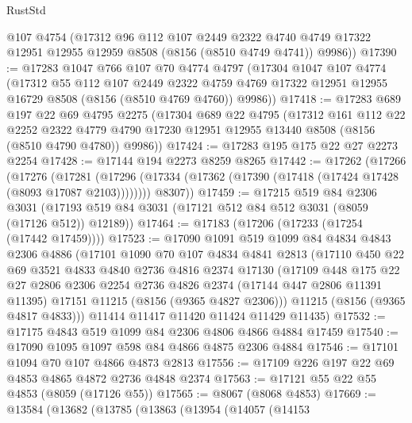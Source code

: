 \begin{lexlean}{RustStd}
\begin{coremodule}
{\begin{coremodule}
{{{{{{{{{{{{{{{{{{{{{{{{{{{{{{{{{{      @107
      @4754
      (@17312
        @96
        @112
        @107
        @2449
        @2322
        @4740
        @4749
        @17322
        @12951
        @12955
        @12959
        @8508
        (@8156 (@8510 @4749 @4741))
        @9986))
@17390 := @17283
    @1047
    @766
    @107
    @70
    @4774
    @4797
    (@17304
      @1047
      @107
      @4774
      (@17312
        @55
        @112
        @107
        @2449
        @2322
        @4759
        @4769
        @17322
        @12951
        @12955
        @16729
        @8508
        (@8156 (@8510 @4769 @4760))
        @9986))
@17418 := @17283
    @689
    @197
    @22
    @69
    @4795
    @2275
    (@17304
      @689
      @22
      @4795
      (@17312
        @161
        @112
        @22
        @2252
        @2322
        @4779
        @4790
        @17230
        @12951
        @12955
        @13440
        @8508
        (@8156 (@8510 @4790 @4780))
        @9986))
@17424 := @17283 @195 @175 @22 @27 @2273 @2254
@17428 := @17144 @194 @2273 @8259 @8265
@17442 := @17262
    (@17266
      (@17276
        (@17281 (@17296 (@17334 (@17362 (@17390 (@17418 (@17424 @17428 (@8093 @17087 @2103))))))))
        @8307))
@17459 := @17215
    @519
    @84
    @2306
    @3031
    (@17193 @519 @84 @3031 (@17121 @512 @84 @512 @3031 (@8059 (@17126 @512)) @12189))
@17464 := @17183 (@17206 (@17233 (@17254 (@17442 @17459))))
@17523 := @17090
    @1091
    @519
    @1099
    @84
    @4834
    @4843
    @2306
    @4886
    (@17101
      @1090
      @70
      @107
      @4834
      @4841
      @2813
      (@17110
        @450
        @22
        @69
        @3521
        @4833
        @4840
        @2736
        @4816
        @2374
        @17130
        (@17109
          @448
          @175
          @22
          @27
          @2806
          @2306
          @2254
          @2736
          @4826
          @2374
          (@17144 @447 @2806 @11391 @11395)
          @17151
          @11215
          (@8156 (@9365 @4827 @2306)))
        @11215
        (@8156 (@9365 @4817 @4833)))
      @11414
      @11417
      @11420
      @11424
      @11429
      @11435)
@17532 := @17175 @4843 @519 @1099 @84 @2306 @4806 @4866 @4884 @17459
@17540 := @17090 @1095 @1097 @598 @84 @4866 @4875 @2306 @4884
@17546 := @17101 @1094 @70 @107 @4866 @4873 @2813
@17556 := @17109 @226 @197 @22 @69 @4853 @4865 @4872 @2736 @4848 @2374
@17563 := @17121 @55 @22 @55 @4853 (@8059 (@17126 @55))
@17565 := @8067 (@8068 @4853)
@17669 := @13584
    (@13682
      (@13785
        (@13863
          (@13954
            (@14057
              (@14153
}}}}}}}}}}}}}}}}}}}}}}}}}}}}}}}}}}
\end{coremodule}}
\end{coremodule}
\end{lexlean}
